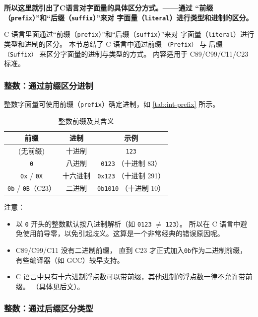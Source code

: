 \textbf{所以这里就引出了C语言对字面量的具体区分方式。——通过
“前缀（\texttt{prefix}）”和“后缀（\texttt{suffix}）”来对
字面量（\texttt{literal}）进行类型和进制的区分。}

C 语言里面通过“前缀（\texttt{prefix}）”和“后缀（\texttt{suffix}）”来对
字面量（\texttt{literal}）进行类型和进制的区分。
本节总结了 C 语言中通过前缀 \texttt{（Prefix）} 与
后缀 \texttt{（Suffix）} 来区分字面量的进制与类型的方式。
内容适用于 C89/C99/C11/C23 标准。
\newpage


\subsubsection{整数：通过前缀区分进制}

整数字面量可使用前缀（\texttt{prefix}）确定进制，如 \autoref{tab:int-prefix} 所示。

\begin{table}[h!]
\centering
\caption{整数前缀及其含义}\label{tab:int-prefix}
\begin{tabular}{c|c|c}
\hline
前缀 & 进制 & 示例 \\ \hline
(无前缀) & 十进制 & \verb|123| \\
\verb|0| & 八进制 & \verb|0123| （十进制 83）\\
\verb|0x| / \verb|0X| & 十六进制 & \verb|0x123| （十进制 291）\\
\verb|0b| / \verb|0B|（C23） & 二进制 & \verb|0b1010| （十进制 10）\\
\hline
\end{tabular}
\end{table}


注意：
\begin{itemize}
    \item 以 \texttt{0} 开头的整数默认按八进制解析（如 \texttt{0123} $\neq$ \texttt{123}）。
    所以在 C 语言中避免使用前导零，以免引起歧义。这算是一个非常经典的错误原因呢。
    \item  C89/C99/C11 没有二进制前缀， 直到 C23 才正式加入\texttt{0b}作为二进制前缀，
    有些编译器（如 GCC）较早支持。
    \item C 语言中只有十六进制浮点数可以带前缀，其他进制的浮点数一律不允许带前缀。
    （具体见后文）。
\end{itemize}


 
\subsubsection{整数：通过后缀区分类型}



